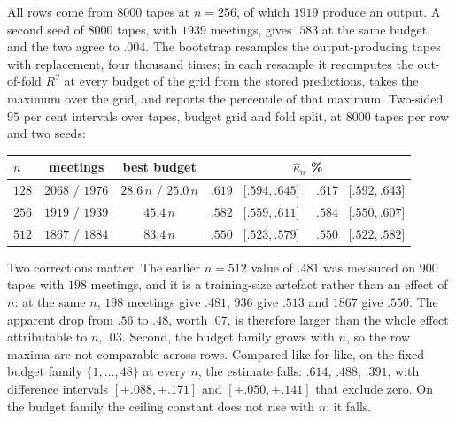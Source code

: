 \documentclass[11pt]{article}
\begin{document}
All rows come from $8000$ tapes at $n=256$, of which $1919$ produce an output. A second seed of
$8000$ tapes, with $1939$ meetings, gives $.583$ at the same budget, and the two agree to $.004$.
The bootstrap resamples the output-producing tapes with replacement, four thousand times; in each
resample it recomputes the out-of-fold $R^2$ at every budget of the grid from the stored predictions,
takes the maximum over the grid, and reports the percentile of that maximum. Two-sided $95$ per cent
intervals over tapes, budget grid and fold split, at $8000$ tapes per row and two seeds:

\begin{center}
\begin{tabular}{lccc}
\toprule
$n$ & meetings & best budget & $\hat\kappa_n$ \quad 95\% \\
\midrule
$128$ & $2068$ / $1976$ & $28.6\,n$ / $25.0\,n$ & $.619$ \ [$.594,.645$] \ \ $.617$ \ [$.592,.643$] \\
$256$ & $1919$ / $1939$ & $45.4\,n$            & $.582$ \ [$.559,.611$] \ \ $.584$ \ [$.550,.607$] \\
$512$ & $1867$ / $1884$ & $83.4\,n$            & $.550$ \ [$.523,.579$] \ \ $.550$ \ [$.522,.582$] \\
\bottomrule
\end{tabular}
\end{center}

Two corrections matter. The earlier $n=512$ value of $.481$ was measured on $900$ tapes with $198$
meetings, and it is a training-size artefact rather than an effect of $n$: at the same $n$, $198$
meetings give $.481$, $936$ give $.513$ and $1867$ give $.550$. The apparent drop from $.56$ to $.48$,
worth $.07$, is therefore larger than the whole effect attributable to $n$, $.03$. Second, the budget
family grows with $n$, so the row maxima are not comparable across rows. Compared like for like, on the
fixed budget family $\{1,\dots,48\}$ at every $n$, the estimate falls: $.614$, $.488$, $.391$, with
difference intervals $[+.088,+.171]$ and $[+.050,+.141]$ that exclude zero. On the budget family the
ceiling constant does not rise with $n$; it falls.
\end{document}
